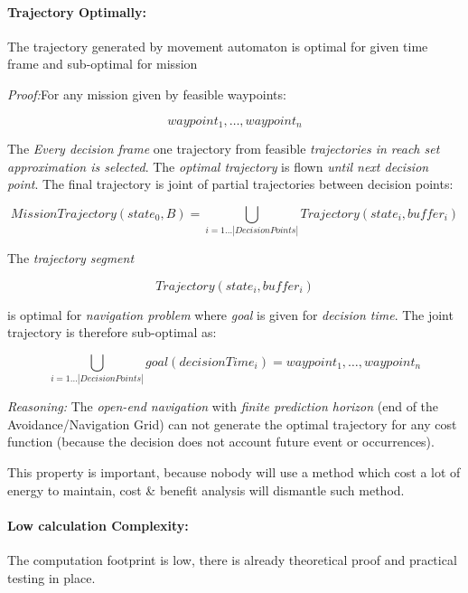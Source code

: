 \documentclass[12pt, a4paper]{report}
\theoremstyle{plain}
\theoremstyle{plain}
\theoremstyle{remark}
\begin{document}
\paragraph{Trajectory Optimally:}  The trajectory generated by movement automaton is optimal for given time frame and sub-optimal for mission

\emph{Proof:}For any mission given by feasible waypoints:

\begin{equation*}
    waypoint_1, \dots, waypoint_n
\end{equation*}

The \emph{Every decision frame} one trajectory from feasible \emph{trajectories in reach set approximation is selected}. The \emph{optimal trajectory} is flown \emph{until next decision point}. The final trajectory is joint of partial trajectories between decision points:

\begin{equation*}
    Mission Trajectory(state_0,B) = \bigcup_{i=1\dots|Decision Points|} Trajectory(state_i,buffer_i) 
\end{equation*}

The \emph{trajectory segment}

\begin{equation*}
    Trajectory(state_i,buffer_i) 
\end{equation*}

is optimal  for \emph{navigation problem} where \emph{goal} is given for \emph{decision time}. The joint trajectory is therefore sub-optimal as: 

\begin{equation*}
    \bigcup_{i=1\dots|Decision Points|}goal(decision Time _i)  = waypoint_1, \dots, waypoint_n
\end{equation*}

\noindent \emph{Reasoning:} The \emph{open-end navigation} with \emph{finite prediction horizon} (end of the Avoidance/Navigation Grid) can not generate the optimal trajectory for any cost function (because the decision does not account future event or occurrences). 

This property is important, because nobody will use a method which cost a lot of energy to maintain, cost \& benefit analysis will dismantle such method.

\paragraph{Low calculation Complexity:} The computation footprint is low, there is already theoretical proof and practical testing in place.
\end{document}
